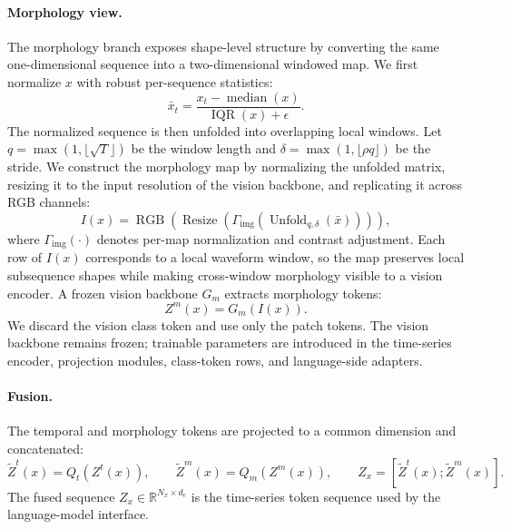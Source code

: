 \documentclass{article}
\begin{document}
\paragraph{Morphology view.}
The morphology branch exposes shape-level structure by converting the same
one-dimensional sequence into a two-dimensional windowed map. We first normalize
$x$ with robust per-sequence statistics:
\begin{equation}
\label{eq:robust-normalization}
\bar{x}_t
=
\frac{x_t-\operatorname{median}(x)}
{\operatorname{IQR}(x)+\epsilon}.
\end{equation}
The normalized sequence is then unfolded into overlapping local windows. Let
$q=\max(1,\lfloor\sqrt{T}\rfloor)$ be the window length and
$\delta=\max(1,\lfloor\rho q\rfloor)$ be the stride. We construct the morphology
map by normalizing the unfolded matrix, resizing it to the input resolution of
the vision backbone, and replicating it across RGB channels:
\begin{equation}
\label{eq:morphology-map}
I(x)
=
\operatorname{RGB}
\left(
\operatorname{Resize}
\left(
\Gamma_{\mathrm{img}}
\left(
\operatorname{Unfold}_{q,\delta}(\bar{x})
\right)
\right)
\right),
\end{equation}
where $\Gamma_{\mathrm{img}}(\cdot)$ denotes per-map normalization and contrast
adjustment. Each row of $I(x)$ corresponds to a local waveform window, so the map
preserves local subsequence shapes while making cross-window morphology visible
to a vision encoder. A frozen vision backbone $G_m$ extracts morphology tokens:
\begin{equation}
\label{eq:morphology-encoder}
Z^{m}(x)=G_m(I(x)).
\end{equation}
We discard the vision class token and use only the patch tokens. The vision
backbone remains frozen; trainable parameters are introduced in the time-series
encoder, projection modules, class-token rows, and language-side adapters.

\paragraph{Fusion.}
The temporal and morphology tokens are projected to a common dimension and
concatenated:
\begin{equation}
\label{eq:dual-view-fusion}
\tilde{Z}^{t}(x)=Q_t(Z^{t}(x)),
\qquad
\tilde{Z}^{m}(x)=Q_m(Z^{m}(x)),
\qquad
Z_x=
\left[
\tilde{Z}^{t}(x);
\tilde{Z}^{m}(x)
\right].
\end{equation}
The fused sequence $Z_x\in\mathbb{R}^{N_x\times d_e}$ is the time-series token
sequence used by the language-model interface.
\end{document}

